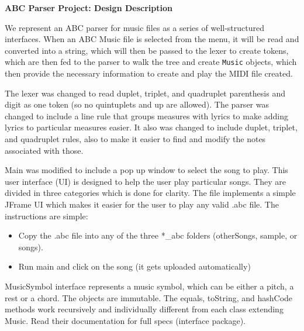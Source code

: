 \documentclass[12pt]{book}
\begin{document}
\phantom{xxx}
\bigskip
\centerline{{\large \bf ABC Parser Project: Design Description }}
\bigskip\bigskip


We represent an ABC parser for music files as a series of well-structured interfaces. When an ABC Music file is selected from the menu, it will be read and converted into a string, which will then be passed to the lexer to create tokens, which are then fed to the parser to walk the tree and create {\tt Music} objects, which then provide the necessary information to create and play the MIDI file created.

\bigskip
{}
\bigskip

The lexer was changed to read duplet, triplet, and quadruplet parenthesis and digit as one token (so no quintuplets and up are allowed). The parser was changed to include a line rule that groups measures with lyrics to make adding lyrics to particular measures easier. It also was changed to include duplet, triplet, and quadruplet rules, also to make it easier to find and modify the notes associated with those.

Main was modified to include a pop up window to select the song to play. This user interface (UI) is designed to help the user play particular songs. They are divided in three categories which is done for clarity. 
The file implements a simple JFrame UI which makes it easier for the user to play any valid .abc file. The instructions are simple:

\begin{itemize}
\item Copy the .abc file into any of the three *\_abc folders (otherSongs, sample, or songs).
\item Run main and click on the song (it gets uploaded automatically)
\end{itemize}


MusicSymbol interface represents a music symbol, which can be either a pitch, a rest or a chord. The objects are immutable. The equals, toString, and hashCode methods work recursively and individually different from each class extending Music. Read their documentation for full specs (interface package). \\
\end{document}
